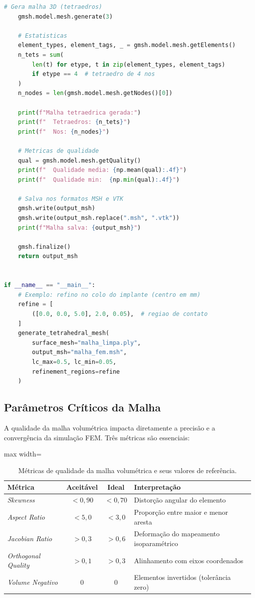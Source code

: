 \begin{lstlisting}[language=Python, caption={Geração de malha volumétrica tetraédrica com Gmsh}, label={lst:gmsh_tet}]
    # Gera malha 3D (tetraedros)
    gmsh.model.mesh.generate(3)
    
    # Estatisticas
    element_types, element_tags, _ = gmsh.model.mesh.getElements()
    n_tets = sum(
        len(t) for etype, t in zip(element_types, element_tags)
        if etype == 4  # tetraedro de 4 nos
    )
    n_nodes = len(gmsh.model.mesh.getNodes()[0])
    
    print(f"Malha tetraedrica gerada:")
    print(f"  Tetraedros: {n_tets}")
    print(f"  Nos: {n_nodes}")
    
    # Metricas de qualidade
    qual = gmsh.model.mesh.getQuality()
    print(f"  Qualidade media: {np.mean(qual):.4f}")
    print(f"  Qualidade min:  {np.min(qual):.4f}")
    
    # Salva nos formatos MSH e VTK
    gmsh.write(output_msh)
    gmsh.write(output_msh.replace(".msh", ".vtk"))
    print(f"Malha salva: {output_msh}")
    
    gmsh.finalize()
    return output_msh


if __name__ == "__main__":
    # Exemplo: refino no colo do implante (centro em mm)
    refine = [
        ([0.0, 0.0, 5.0], 2.0, 0.05),  # regiao de contato
    ]
    generate_tetrahedral_mesh(
        surface_mesh="malha_limpa.ply",
        output_msh="malha_fem.msh",
        lc_max=0.5, lc_min=0.05,
        refinement_regions=refine
    )
\end{lstlisting}

\subsection{Parâmetros Críticos da Malha}

A qualidade da malha volumétrica impacta diretamente a precisão e a
convergência da simulação FEM. Três métricas são essenciais:

\begin{table}[htb]
\centering
\caption{Métricas de qualidade da malha volumétrica e seus valores de referência.}
\label{tab:qualidade-malha}
\begin{adjustbox}{max width=\textwidth}
\begin{tabular}{lccp{4cm}}
\toprule
\textbf{Métrica} & \textbf{Aceitável} & \textbf{Ideal} & \textbf{Interpretação} \\
\midrule
\textit{Skewness} & $<0,90$ & $<0,70$ & Distorção angular do elemento \\
\textit{Aspect Ratio} & $<5,0$ & $<3,0$ & Proporção entre maior e menor aresta \\
\textit{Jacobian Ratio} & $>0,3$ & $>0,6$ & Deformação do mapeamento isoparamétrico \\
\textit{Orthogonal Quality} & $>0,1$ & $>0,3$ & Alinhamento com eixos coordenados \\
\textit{Volume Negativo} & 0 & 0 & Elementos invertidos (tolerância zero) \\
\bottomrule
\end{tabular}
\end{adjustbox}
\end{table}


